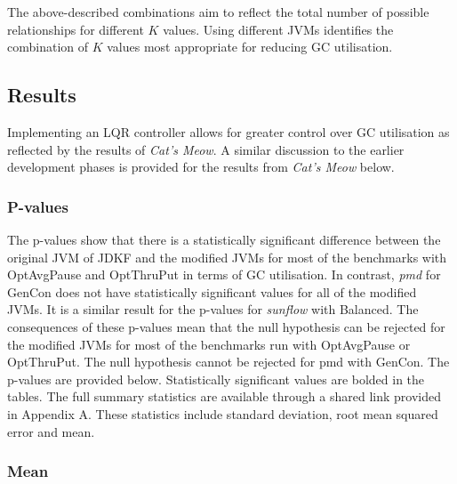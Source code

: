 The above-described combinations aim to reflect the total number of
possible relationships for different $K$ values. Using different JVMs
identifies the combination of $K$ values most appropriate for reducing GC
utilisation.

\subsection{Results}
Implementing an LQR controller allows for greater control over GC
utilisation as reflected by the results of \emph{Cat's Meow}. A similar
discussion to the earlier development phases is provided for the
results from \emph{Cat's Meow} below.
\subsubsection{P-values}
The p-values show that there is a statistically significant difference
between the original JVM of JDKF and the modified JVMs for most of the
benchmarks with OptAvgPause and OptThruPut in terms of GC utilisation. In contrast, \emph{pmd} for GenCon
does not have statistically significant values for all of the modified
JVMs. It is a similar result for the p-values for \emph{sunflow} with Balanced.
The consequences of these p-values mean that the null hypothesis can be
rejected for the modified JVMs for most of the benchmarks run with
OptAvgPause or OptThruPut. The null hypothesis cannot be rejected for
pmd with GenCon. The p-values are provided below. Statistically significant values are bolded in the tables. 
\newline\newline
The full summary statistics are available through a shared link provided
in Appendix A. These statistics include standard deviation, root mean
squared error and mean.

\subsubsection{Mean}


